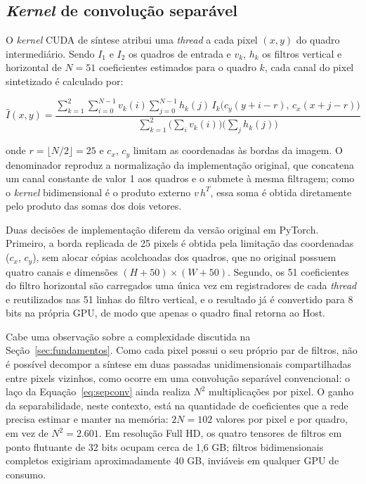 \documentclass[
    12pt,                %
    openright,           %
    oneside,             %
    a4paper,             %
    english,             %
    brazil               %
]{abntex2}
\begin{document}
\subsection{\textit{Kernel} de convolução separável}

O \textit{kernel} CUDA de síntese atribui uma \textit{thread} a cada pixel $(x, y)$ do quadro intermediário. Sendo $I_1$ e $I_2$ os quadros de entrada e $v_k$, $h_k$ os filtros vertical e horizontal de $N = 51$ coeficientes estimados para o quadro $k$, cada canal do pixel sintetizado é calculado por:

\begin{equation}
\hat{I}(x,y) = \frac{\displaystyle\sum_{k=1}^{2} \sum_{i=0}^{N-1} v_k(i) \sum_{j=0}^{N-1} h_k(j)\, I_k\big(c_y(y+i-r),\, c_x(x+j-r)\big)}{\displaystyle\sum_{k=1}^{2} \Big(\sum_{i} v_k(i)\Big)\Big(\sum_{j} h_k(j)\Big)}
\label{eq:sepconv}
\end{equation}

\noindent onde $r = \lfloor N/2 \rfloor = 25$ e $c_x$, $c_y$ limitam as coordenadas às bordas da imagem. O denominador reproduz a normalização da implementação original, que concatena um canal constante de valor 1 aos quadros e o submete à mesma filtragem; como o \textit{kernel} bidimensional é o produto externo $v\,h^{T}$, essa soma é obtida diretamente pelo produto das somas dos dois vetores.

Duas decisões de implementação diferem da versão original em PyTorch. Primeiro, a borda replicada de 25 pixels é obtida pela limitação das coordenadas ($c_x$, $c_y$), sem alocar cópias acolchoadas dos quadros, que no original possuem quatro canais e dimensões $(H+50) \times (W+50)$. Segundo, os 51 coeficientes do filtro horizontal são carregados uma única vez em registradores de cada \textit{thread} e reutilizados nas 51 linhas do filtro vertical, e o resultado já é convertido para 8 bits na própria GPU, de modo que apenas o quadro final retorna ao Host.

Cabe uma observação sobre a complexidade discutida na Seção~\ref{sec:fundamentos}. Como cada pixel possui o seu próprio par de filtros, não é possível decompor a síntese em duas passadas unidimensionais compartilhadas entre pixels vizinhos, como ocorre em uma convolução separável convencional: o laço da Equação~\ref{eq:sepconv} ainda realiza $N^2$ multiplicações por pixel. O ganho da separabilidade, neste contexto, está na quantidade de coeficientes que a rede precisa estimar e manter na memória: $2N = 102$ valores por pixel e por quadro, em vez de $N^2 = 2.601$. Em resolução Full HD, os quatro tensores de filtros em ponto flutuante de 32 bits ocupam cerca de 1,6 GB; filtros bidimensionais completos exigiriam aproximadamente 40 GB, inviáveis em qualquer GPU de consumo.
\end{document}
